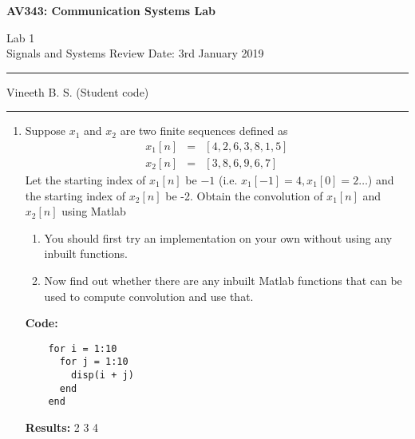 \documentclass[11pt]{article}
\newcommand{\myhrule}{
\vspace{0.1in}
\hrule
\vspace{0.1in}
}
\newcommand{\code}{\textbf{Code: }}
\newcommand{\results}{\textbf{Results: }}
\begin{document}
\begin{center}
\bf\large AV343: Communication Systems Lab
\end{center}

\noindent
Lab 1         	 %
\\
Signals and Systems Review %
\hfill
Date: 3rd January 2019      %

\noindent
\myhrule
Vineeth B. S. (Student code)
\myhrule

\medskip

\begin{enumerate}
\item Suppose $x_{1}$ and $x_{2}$ are two finite sequences defined as
  \begin{eqnarray*}
    x_{1}[n] & = & [4,2,6,3,8,1,5] \\
    x_{2}[n] & = & [3,8,6,9,6,7]
  \end{eqnarray*}
  Let the starting index of $x_{1}[n]$ be $-1$ (i.e. $x_{1}[-1] = 4, x_{1}[0] = 2 \dots$) and the starting index of $x_{2}[n]$ be -2.
  Obtain the convolution of $x_{1}[n]$ and $x_{2}[n]$ using Matlab
  \begin{enumerate}
  \item You should first try an implementation on your own without using any inbuilt functions.
  \item Now find out whether there are any inbuilt Matlab functions that can be used to compute convolution and use that.
  \end{enumerate}


  \code
  \begin{lstlisting}
    for i = 1:10
      for j = 1:10
        disp(i + j)
      end
    end
  \end{lstlisting}

  \results
  2
  3
  4
  

\end{enumerate}
\end{document}
